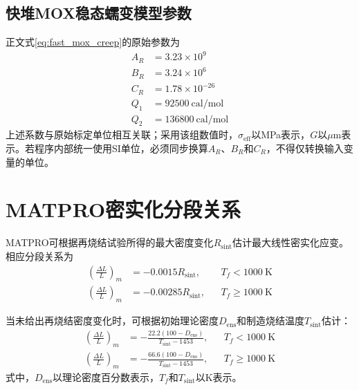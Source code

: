 \subsection{快堆MOX稳态蠕变模型参数}

正文式\eqref{eq:fast_mox_creep}的原始参数为
\begin{equation}
	\begin{aligned}
		A_R&=3.23\times10^{9}
				\\
				B_R&=3.24\times10^{6}
				\\
				C_R&=1.78\times10^{-26}
				\\
				Q_1&=92500\ \mathrm{cal/mol}
				\\
				Q_2&=136800\ \mathrm{cal/mol}
	\end{aligned}
	\label{eq:appendix_fast_mox_creep_parameters}
\end{equation}
\label{eq:appendix_fast_mox_creep_A}
\label{eq:appendix_fast_mox_creep_B}
\label{eq:appendix_fast_mox_creep_C}
\label{eq:appendix_fast_mox_creep_Q1}
\label{eq:appendix_fast_mox_creep_Q2}
上述系数与原始标定单位相互关联；采用该组数值时，$\sigma_{\mathrm{eff}}$以MPa表示，$G$以$\mu\mathrm{m}$表示。若程序内部统一使用SI单位，必须同步换算$A_R$、$B_R$和$C_R$，不得仅转换输入变量的单位。

\section{MATPRO密实化分段关系}
\label{app:mox_densification_correlations}

MATPRO可根据再烧结试验所得的最大密度变化$R_{\mathrm{sint}}$估计最大线性密实化应变。相应分段关系为
\begin{equation}
	\begin{aligned}
		\left(\frac{\Delta L}{L}\right)_m
				&=-0.0015R_{\mathrm{sint}},
				&&T_f<1000\ \mathrm{K}
				\\
				\left(\frac{\Delta L}{L}\right)_m
				&=-0.00285R_{\mathrm{sint}},
				&&T_f\geq1000\ \mathrm{K}
	\end{aligned}
	\label{eq:appendix_densification_resintering}
\end{equation}
\label{eq:appendix_densification_resintering_lowT}
\label{eq:appendix_densification_resintering_highT}

当未给出再烧结密度变化时，可根据初始理论密度$D_{\mathrm{ens}}$和制造烧结温度$T_{\mathrm{sint}}$估计：
\begin{equation}
	\begin{aligned}
		\left(\frac{\Delta L}{L}\right)_m
				&=-\frac{22.2(100-D_{\mathrm{ens}})}
				{T_{\mathrm{sint}}-1453},
				&&T_f<1000\ \mathrm{K}
				\\
				\left(\frac{\Delta L}{L}\right)_m
				&=-\frac{66.6(100-D_{\mathrm{ens}})}
				{T_{\mathrm{sint}}-1453},
				&&T_f\geq1000\ \mathrm{K}
	\end{aligned}
	\label{eq:appendix_densification_sintering_temperature}
\end{equation}
\label{eq:appendix_densification_sintering_lowT}
\label{eq:appendix_densification_sintering_highT}
式中，$D_{\mathrm{ens}}$以理论密度百分数表示，$T_f$和$T_{\mathrm{sint}}$以K表示。

